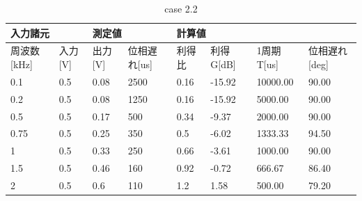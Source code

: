 \documentclass[dvipdfmx,titlepage,a4j]{jsarticle}  %
\begin{document}
\begin{table}[H]
  \centering
  \caption{case 2.2}
  \begin{tabular}{ll|ll|llll}
  \hline
  \multicolumn{2}{l|}{入力諸元}                        & \multicolumn{2}{l|}{測定値}                           & \multicolumn{4}{l}{計算値}                                                                                                                          \\ \hline
  \multicolumn{1}{l|}{周波数{[}kHz{]}} & 入力{[}V{]} & \multicolumn{1}{l|}{出力{[}V{]}} & 位相遅れ{[}us{]} & \multicolumn{1}{l|}{利得比} & \multicolumn{1}{l|}{利得G{[}dB{]}} & \multicolumn{1}{l|}{1周期T{[}us{]}} & \multicolumn{1}{l}{位相遅れ{[}deg{]}} \\ \hline \hline
  \multicolumn{1}{l|}{0.1}           & 0.5         & \multicolumn{1}{l|}{0.08}        & 2500            & \multicolumn{1}{l|}{0.16}    & \multicolumn{1}{l|}{-15.92}          & \multicolumn{1}{l|}{10000.00}        & 90.00                               \\ \hline
  \multicolumn{1}{l|}{0.2}           & 0.5         & \multicolumn{1}{l|}{0.08}        & 1250            & \multicolumn{1}{l|}{0.16}    & \multicolumn{1}{l|}{-15.92}          & \multicolumn{1}{l|}{5000.00}         & 90.00                               \\ \hline
  \multicolumn{1}{l|}{0.5}           & 0.5         & \multicolumn{1}{l|}{0.17}        & 500             & \multicolumn{1}{l|}{0.34}    & \multicolumn{1}{l|}{-9.37}           & \multicolumn{1}{l|}{2000.00}         & 90.00                               \\ \hline
  \multicolumn{1}{l|}{0.75}          & 0.5         & \multicolumn{1}{l|}{0.25}        & 350             & \multicolumn{1}{l|}{0.5}     & \multicolumn{1}{l|}{-6.02}           & \multicolumn{1}{l|}{1333.33}         & 94.50                               \\ \hline
  \multicolumn{1}{l|}{1}             & 0.5         & \multicolumn{1}{l|}{0.33}        & 250             & \multicolumn{1}{l|}{0.66}    & \multicolumn{1}{l|}{-3.61}           & \multicolumn{1}{l|}{1000.00}         & 90.00                               \\ \hline
  \multicolumn{1}{l|}{1.5}           & 0.5         & \multicolumn{1}{l|}{0.46}        & 160             & \multicolumn{1}{l|}{0.92}    & \multicolumn{1}{l|}{-0.72}           & \multicolumn{1}{l|}{666.67}          & 86.40                               \\ \hline
  \multicolumn{1}{l|}{2}             & 0.5         & \multicolumn{1}{l|}{0.6}         & 110             & \multicolumn{1}{l|}{1.2}     & \multicolumn{1}{l|}{1.58}            & \multicolumn{1}{l|}{500.00}          & 79.20                               \\ \hline

\end{tabular}
\end{table}
\end{document}
